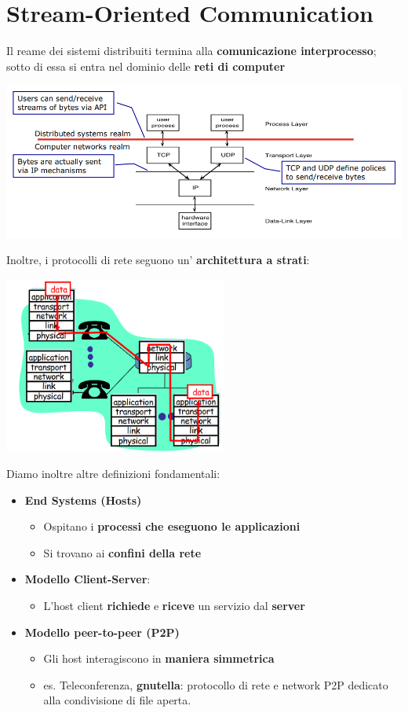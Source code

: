 \documentclass[12pt]{article}
\begin{document}
\section{Stream-Oriented Communication}
Il reame dei sistemi distribuiti termina alla \textbf{comunicazione interprocesso}; sotto di essa si entra nel dominio delle \textbf{reti di computer}
\begin{center}
    \includegraphics[width = 1\textwidth]{Images/21.png}
\end{center}
Inoltre, i protocolli di rete seguono un' \textbf{architettura a strati}:
\begin{center}
    \includegraphics[width = 0.55\textwidth]{Images/22.png}
\end{center}
Diamo inoltre altre definizioni fondamentali:
\begin{itemize}
    \item \textbf{End Systems (Hosts)}
          \begin{itemize}
              \item Ospitano i \textbf{processi che eseguono le applicazioni}
              \item Si trovano ai \textbf{confini della rete}
          \end{itemize}
    \item \textbf{Modello Client-Server}:
          \begin{itemize}
              \item L'host client \textbf{richiede} e \textbf{riceve} un servizio dal \textbf{server}
          \end{itemize}
    \item \textbf{Modello peer-to-peer (P2P)}
          \begin{itemize}
              \item Gli host interagiscono in \textbf{maniera simmetrica}
              \item es. Teleconferenza, \textbf{gnutella}: protocollo di rete e network P2P dedicato alla condivisione di file aperta.
          \end{itemize}
\end{itemize}
\end{document}

